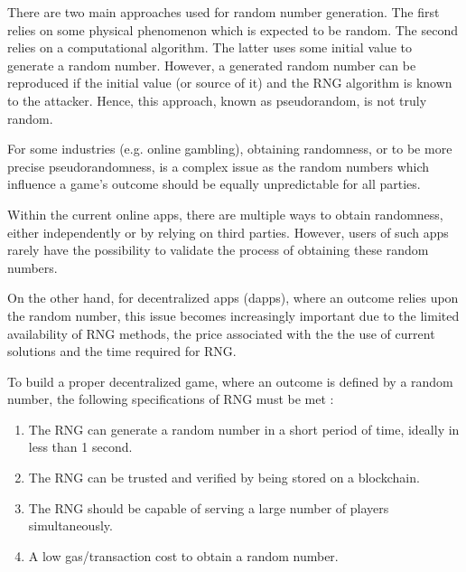 \documentclass[12pt]{article}
\begin{document}
There are two main approaches used for random number generation. The first relies on some physical phenomenon which is expected to be random. The second relies on a computational algorithm. The latter uses some initial value to generate a random number. However, a generated random number can be reproduced if the initial value (or source of it) and the RNG algorithm is known to the attacker. Hence, this approach, known as pseudorandom, is not truly random.\par

For some industries (e.g. online gambling), obtaining randomness, or to be more precise pseudorandomness, is a complex issue as the random numbers which influence a game’s outcome should be equally unpredictable for all parties.\par

Within the current online apps, there are multiple ways to obtain randomness, either independently or by relying on third parties. However, users of such apps rarely have the possibility to validate the process of obtaining these random numbers.\par

On the other hand, for decentralized apps (dapps), where an outcome relies upon the random number, this issue becomes increasingly important due to the limited availability of RNG methods, the price associated with the the use of current solutions and the time required for RNG.\par

To build a proper decentralized game, where an outcome is defined by a random number, the following specifications of RNG must be met  \cite{Tomas_Draksas_2017_Aug_28}:\par

\begin{enumerate}
	\item The RNG can generate a random number in a short period of time, ideally in less than 1 second.\par

	\item The RNG can be trusted and verified by being stored on a blockchain.\par

	\item The RNG should be capable of serving a large number of players simultaneously.\par

	\item A low gas/transaction cost to obtain a random number.
\end{enumerate}\par
\end{document}
